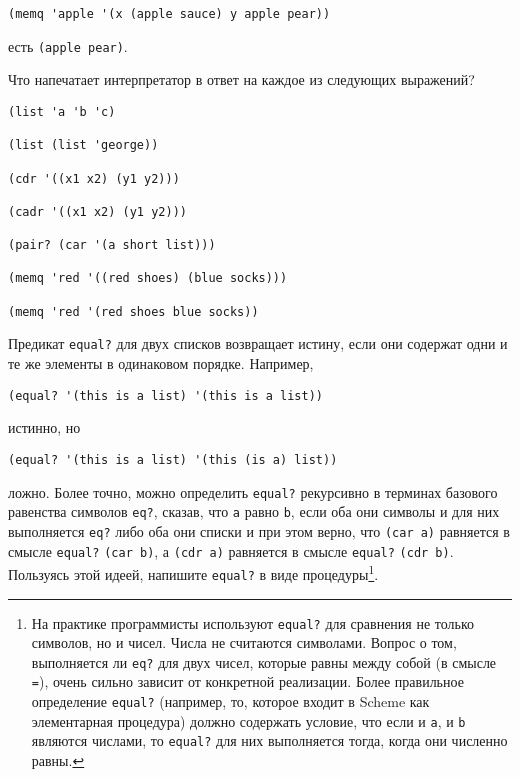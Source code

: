 \begin{Verbatim}[fontsize=\small]
(memq 'apple '(x (apple sauce) y apple pear))
\end{Verbatim}
есть {\tt (apple pear)}.
\begin{exercise}{2.53}\label{EX2.53}%
Что напечатает интерпретатор в ответ на каждое из
следующих выражений?

\begin{Verbatim}[fontsize=\small]
(list 'a 'b 'c)

(list (list 'george))

(cdr '((x1 x2) (y1 y2)))

(cadr '((x1 x2) (y1 y2)))

(pair? (car '(a short list)))

(memq 'red '((red shoes) (blue socks)))

(memq 'red '(red shoes blue socks))
\end{Verbatim}
\end{exercise}
\begin{exercise}{2.54}\label{EX2.54}%
%
%
Предикат {\tt equal?}
для двух списков возвращает
истину, если они содержат одни и те же элементы в одинаковом
порядке. Например,

\begin{Verbatim}[fontsize=\small]
(equal? '(this is a list) '(this is a list))
\end{Verbatim}
истинно, но

\begin{Verbatim}[fontsize=\small]
(equal? '(this is a list) '(this (is a) list))
\end{Verbatim}
ложно.  Более точно, можно определить {\tt equal?}
рекурсивно в терминах базового равенства символов {\tt eq?},
сказав, что {\tt a} равно {\tt b}, если оба они символы
и для них выполняется {\tt eq?} либо оба они списки и при этом
верно, что {\tt (car a)} равняется в смысле {\tt equal?} 
{\tt (car b)}, а {\tt (cdr a)} равняется в смысле 
{\tt equal?} {\tt (cdr b)}.  Пользуясь этой идеей, напишите 
{\tt equal?} в виде процедуры\footnote{На практике программисты используют
{\tt equal?} для
сравнения не только символов, но и чисел.
Числа не считаются символами.  Вопрос о том, выполняется ли
{\tt eq?} для двух чисел, которые равны между собой (в смысле
{\tt =}), очень сильно зависит от конкретной реализации.  Более 
правильное определение {\tt equal?} (например, то, которое
входит в Scheme как элементарная процедура) должно содержать условие, что 
если и {\tt a}, и {\tt b} являются числами, то
{\tt equal?} для них выполняется тогда, когда они численно равны.}.
\end{exercise}

